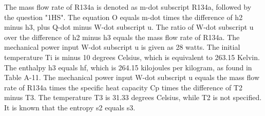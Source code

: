 The mass flow rate of R134a is denoted as m-dot subscript R134a, followed by the question "1HS". The equation O equals m-dot times the difference of h2 minus h3, plus Q-dot minus W-dot subscript u. The ratio of W-dot subscript u over the difference of h2 minus h3 equals the mass flow rate of R134a. The mechanical power input W-dot subscript u is given as 28 watts. The initial temperature Ti is minus 10 degrees Celsius, which is equivalent to 263.15 Kelvin. The enthalpy h3 equals hf, which is 264.15 kilojoules per kilogram, as found in Table A-11. The mechanical power input W-dot subscript u equals the mass flow rate of R134a times the specific heat capacity Cp times the difference of T2 minus T3. The temperature T3 is 31.33 degrees Celsius, while T2 is not specified. It is known that the entropy s2 equals s3.